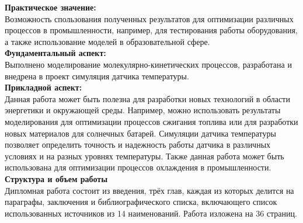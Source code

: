 \indent \textbf{Практическое значение:} \\
\indent Возможность спользования полученных результатов для оптимизации различных процессов в промышленности, например, для тестирования работы оборудования, а также использование моделей в образовательной сфере.\\

\indent \textbf{Фундаментальный аспект:} \\
\indent Выполнено моделирование молекулярно-кинетических процессов, разработана и внедрена в проект симуляция датчика температуры. \\

\indent \textbf{Прикладной аспект:} \\
\indent Данная работа может быть полезна для разработки новых технологий в области энергетики и окружающей среды. Например, можно использовать результаты моделирования для оптимизации процессов сжигания топлива или для разработки новых материалов для солнечных батарей. Симуляции датчика температуры позволяет определить точность и надежность работы датчика в различных условиях и на разных уровнях температуры. Также данная работа может быть использована для оптимизации процессов охлаждения в промышленности. \\

\noindent \textbf{Структура и объем работы} \\
\indent Дипломная работа состоит из введения, трёх глав, каждая из которых делится на параграфы, заключения и библиографического списка, включающего список использованных источников из 14 наименований. Работа изложена на 36 страниц.



